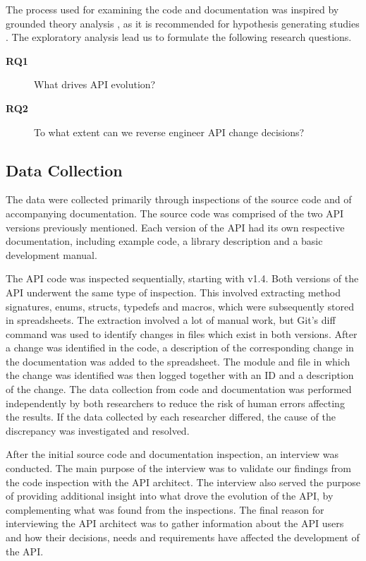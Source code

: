\documentclass{sig-alternate}
\begin{document}
The process used for examining the code and documentation was inspired by grounded theory analysis \cite{seaman1999qualitative}, as it is recommended for hypothesis generating studies \cite{runeson2009guidelines, seaman1999qualitative}. The exploratory analysis lead us to formulate the following research questions.



\begin{description}
\item[\textbf{RQ1}] What drives API evolution?
\item[\textbf{RQ2}] To what extent can we reverse engineer API change decisions?
\end{description}

\newpage


\subsection{Data Collection} \label{data_collection}  
The data were collected primarily through inspections of the source code and of accompanying documentation. The source code was comprised of the two API versions previously mentioned. Each version of the API had its own respective documentation, including example code, a library description and a basic development manual. 

The API code was inspected sequentially, starting with v1.4. Both versions of the API underwent the same type of inspection. This involved extracting method signatures, enums, structs, typedefs and macros, which were subsequently stored in spreadsheets. The extraction involved a lot of manual work, but Git's \cite{git} diff command was used to identify changes in files which exist in both versions. After a change was identified in the code, a description of the corresponding change in the documentation was added to the spreadsheet. The module and file in which the change was identified was then logged together with an ID and a description of the change. The data collection from code and documentation was performed independently by both researchers to reduce the risk of human errors affecting the results. If the data collected by each researcher differed, the cause of the discrepancy was investigated and resolved. 

After the initial source code and documentation inspection, an interview was conducted. The main purpose of the interview was to validate our findings from the code inspection with the API architect. The interview also served the purpose of providing additional insight into what drove the evolution of the API, by complementing what was found from the inspections. The final reason for interviewing the API architect was to gather information about the API users and how their decisions, needs and requirements have affected the development of the API. 
\end{document}
